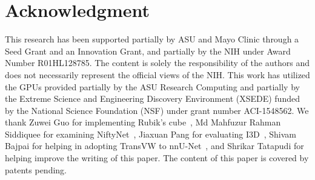 \documentclass[journal,twoside,web]{ieeecolor}
\begin{document}
\section*{Acknowledgment}
This research has been supported partially by ASU and Mayo Clinic through a Seed Grant and an Innovation Grant, and partially by the NIH under Award Number R01HL128785.  The content is solely the responsibility of the authors and does not necessarily represent the official views of the NIH.
 This work has utilized the GPUs provided partially by the ASU Research Computing and partially by the Extreme Science and Engineering Discovery Environment (XSEDE) funded by the National Science Foundation (NSF) under grant number ACI-1548562.
We thank Zuwei Guo for implementing Rubik's cube~\cite{Zhuang2019Self}, Md Mahfuzur Rahman Siddiquee for examining NiftyNet~\cite{gibson2018niftynet}, Jiaxuan Pang for evaluating I3D~\cite{carreira2017quo}, Shivam Bajpai for helping in adopting TransVW to nnU-Net~\cite{isensee2020automated}, and
Shrikar Tatapudi for helping improve the writing of this paper.  The content of this paper is covered by patents pending.  
\end{document}
